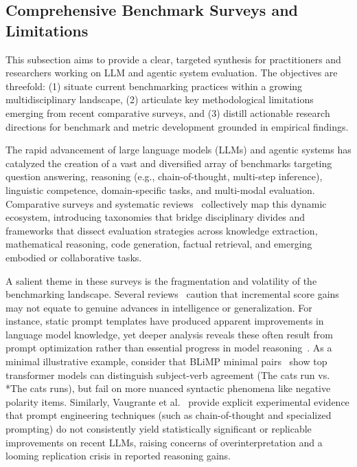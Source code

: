 \documentclass[sigconf]{acmart}
\begin{document}
\subsection{Comprehensive Benchmark Surveys and Limitations}

This subsection aims to provide a clear, targeted synthesis for practitioners and researchers working on LLM and agentic system evaluation. The objectives are threefold: (1) situate current benchmarking practices within a growing multidisciplinary landscape, (2) articulate key methodological limitations emerging from recent comparative surveys, and (3) distill actionable research directions for benchmark and metric development grounded in empirical findings.

The rapid advancement of large language models (LLMs) and agentic systems has catalyzed the creation of a vast and diversified array of benchmarks targeting question answering, reasoning (e.g., chain-of-thought, multi-step inference), linguistic competence, domain-specific tasks, and multi-modal evaluation. Comparative surveys and systematic reviews~\cite{ref1, ref2, ref3, ref4, ref5, ref10, ref11, ref12, ref15, ref20, ref22, ref23, ref31, ref36, ref37, ref38, ref39, ref43, ref46, ref47, ref50, ref55, ref61, ref62, ref63, ref64, ref74, ref75, ref80, ref86, ref87, ref89} collectively map this dynamic ecosystem, introducing taxonomies that bridge disciplinary divides and frameworks that dissect evaluation strategies across knowledge extraction, mathematical reasoning, code generation, factual retrieval, and emerging embodied or collaborative tasks.

A salient theme in these surveys is the fragmentation and volatility of the benchmarking landscape. Several reviews~\cite{ref3, ref5, ref11, ref36, ref38} caution that incremental score gains may not equate to genuine advances in intelligence or generalization. For instance, static prompt templates have produced apparent improvements in language model knowledge, yet deeper analysis reveals these often result from prompt optimization rather than essential progress in model reasoning~\cite{ref98, ref99}. As a minimal illustrative example, consider that BLiMP minimal pairs~\cite{ref99} show top transformer models can distinguish subject-verb agreement (The cats run vs. *The cats runs), but fail on more nuanced syntactic phenomena like negative polarity items. Similarly, Vaugrante et al.~\cite{ref22} provide explicit experimental evidence that prompt engineering techniques (such as chain-of-thought and specialized prompting) do not consistently yield statistically significant or replicable improvements on recent LLMs, raising concerns of overinterpretation and a looming replication crisis in reported reasoning gains.
\end{document}
